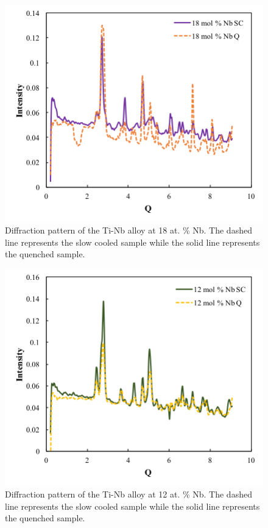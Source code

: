 \pagebreak
\begin{figure}[H]
	\centering
	\includegraphics[width=\textwidth]{Chapter-7/Figures/50diff18.png}
	\caption{Diffraction pattern of the Ti-Nb alloy at 18 at. \% Nb. The dashed line represents the slow cooled sample while the solid line represents the quenched sample.}
	\label{Ch7-figure:50diff18}
\end{figure}

\pagebreak
\begin{figure}[H]
	\centering
	\includegraphics[width=\textwidth]{Chapter-7/Figures/50diff12.png}
	\caption{Diffraction pattern of the Ti-Nb alloy at 12 at. \% Nb. The dashed line represents the slow cooled sample while the solid line represents the quenched sample.}
	\label{Ch7-figure:50diff12}
\end{figure}

